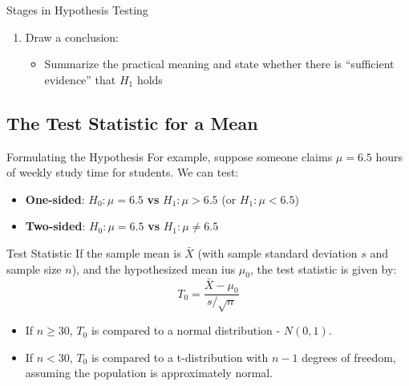\documentclass[10pt]{extarticle}
\begin{document}
\begin{conceptbox}{Stages in Hypothesis Testing}{}
\begin{enumerate}
\begin{itemize}
        \item If p-value $< \alpha$, we reject $H_0$
        \item If p-value $ > \alpha$, we do not reject $H_0$ (We do not conclude $H_0$ is “proven,” just that the sample does not contradict $H_0$ strongly.)
    \end{itemize}
    \item Draw a conclusion:
    \begin{itemize}
        \item Summarize the practical meaning and state whether there is “sufficient evidence” that $H_1$ holds
    \end{itemize}
    \end{enumerate}
\end{conceptbox}


\subsection{The Test Statistic for a Mean}
\begin{conceptbox}{Formulating the Hypothesis}{}
    For example, suppose someone claims $\mu = 6.5$ hours of weekly study time for students. We can test:
    \begin{itemize}
        \item \textbf{One-sided}: $H_0: \mu = 6.5$ \textbf{vs} $H_1: \mu > 6.5$ (or $H_1: \mu < 6.5$)
        \item \textbf{Two-sided}: $H_0: \mu = 6.5$ \textbf{vs} $H_1: \mu \neq 6.5$
    \end{itemize}
\end{conceptbox}



\begin{definitionbox}{Test Statistic}{}
    If the sample mean is $\bar{X}$ (with sample standard deviation $s$ and sample size $n$), and the hypothesized mean ius $\mu_0$, the test statistic is given by:
    $$T_0 = \frac{\bar{X} - \mu_0}{s/\sqrt{n}}$$
    \begin{itemize}
        \item If $n \geq 30$,  $T_0$ is compared to a normal distribution - $N(0, 1)$.
        \item If $n < 30$, $T_0$ is compared to a t-distribution with $n-1$ degrees of freedom, assuming the population is approximately normal.
    \end{itemize}
\end{definitionbox}
\end{document}
